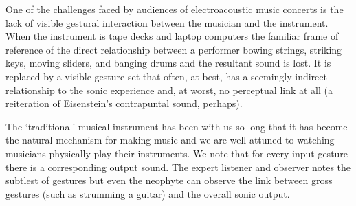 \documentclass[runningheads]{llncs}
\begin{document}
One of the challenges faced by audiences of electroacoustic music concerts is the lack of visible gestural interaction between the musician and the instrument. When the instrument is tape decks and laptop computers the familiar frame of reference of the direct relationship between a performer bowing strings, striking keys, moving sliders, and banging drums and the resultant sound is lost. It is replaced by a visible gesture set that often, at best, has a seemingly indirect relationship to the sonic experience and, at worst, no perceptual link at all (a reiteration of Eisenstein's contrapuntal sound, perhaps).

The `traditional' musical instrument has been with us so long that it has become the natural mechanism for making music and we are well attuned to watching musicians physically play their instruments. We note that for every input gesture there is a corresponding output sound. The expert listener and observer notes the subtlest of gestures but even the neophyte can observe the link between gross gestures (such as strumming a guitar) and the overall sonic output. 
\end{document}
